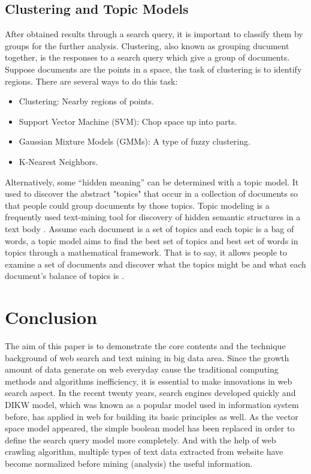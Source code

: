 \documentclass[sigconf]{acmart}
\begin{document}
\subsection{Clustering and Topic Models}
After obtained results through a search query, it is important to classify them by groups for the further analysis. Clustering, also known as grouping ducument together, is the responses to a search query which give a group of documents. Suppose documents are the points in a space, the task of clustering is to identify regions. There are several ways to do this task:
\begin{itemize}
\item Clustering: Nearby regions of points.
\item Support Vector Machine (SVM): Chop space up into parts.
\item Gaussian Mixture Models (GMMs): A type of fuzzy clustering.
\item K-Nearest Neighbors.
\end{itemize}

Alternatively, some ``hidden meaning'' can be determined with a topic model. It used to discover the abstract "topics" that occur in a collection of documents so that people could group documents by those topics. Topic modeling is a frequently used text-mining tool for discovery of hidden semantic structures in a text body \cite{editor11}. Assume each document is a set of topics and each topic is a bag of words, a topic model aims to find the best set of topics and best set of words in topics through a mathematical framework. That is to say, it allows people to examine a set of documents and discover what the topics might be and what each document's balance of topics is \cite{editor11}.

\section{Conclusion}

The aim of this paper is to demonstrate the core contents and the technique background of web search and text mining in big data area. Since the growth amount of data generate on web everyday cause the traditional computing methods and algorithms inefficiency, it is essential to make innovations in web search aspect. In the recent twenty years, search engines developed quickly and DIKW model, which was known as a popular model used in information system before, has applied in web for building its basic principles as well. As the vector space model appeared, the simple boolean model has been replaced in order to define the search query model more completely. And with the help of web crawling algorithm, multiple types of text data extracted from website have become normalized before mining (analysis) the useful information.
\end{document}
